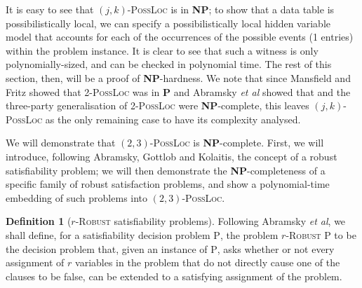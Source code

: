 \documentclass[reprint]{revtex4-1}
\theoremstyle{definition}
\newtheorem{defn}{Definition}
\begin{document}
It is easy to see that $(j,k)$-\textsc{PossLoc} is in \textbf{NP}; to show that a data table is possibilistically local, we can specify a possibilistically local hidden variable model that accounts for each of the occurrences of the possible events (1 entries) within the problem instance. It is clear to see that such a witness is only polynomially-sized, and can be checked in polynomial time. The rest of this section, then, will be a proof of \textbf{NP}-hardness. We note that since Mansfield and Fritz \cite{Mans2011} showed that \textsc{2-PossLoc} was in \textbf{P} and Abramsky \emph{et al} showed that   and the three-party generalisation of \textsc{2-PossLoc} were \textbf{NP}-complete, this leaves $(j,k)$-\textsc{PossLoc} as the only remaining case to have its complexity analysed.

We will demonstrate that $(2,3)$-\textsc{PossLoc} is \textbf{NP}-complete. First, we will introduce, following Abramsky, Gottlob and Kolaitis, the concept of a robust satisfiability problem; we will then demonstrate the \textbf{NP}-completeness of a specific family of robust satisfaction problems, and show a polynomial-time embedding of such problems into $(2,3)$-\textsc{PossLoc}.

\begin{defn}[$r$-\textsc{Robust} satisfiability problems]	
Following Abramsky \emph{et al}, we shall define, for a satisfiability decision problem \textsc{P}, the problem $r$-\textsc{Robust P} to be the decision problem that, given an instance of \textsc{P}, asks whether or not every assignment of $r$ variables in the problem that do not directly cause one of the clauses to be false, can be extended to a satisfying assignment of the problem.
\end{defn}
\end{document}
